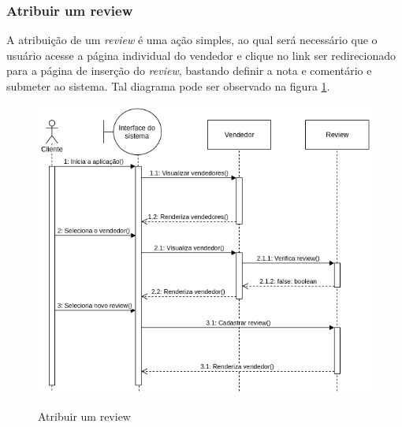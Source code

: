 \subsubsection{Atribuir um review}
A atribuição de um \textit{review} é uma ação simples, ao qual será necessário que o usuário acesse a página individual do vendedor e clique no link ser redirecionado para a página de inserção do \textit{review}, bastando definir a nota e comentário e submeter ao sistema. Tal diagrama pode ser observado na figura \ref{fig:sequence2}.
\begin{figure}[htbp!]
  \centering
  \caption{Atribuir um review}
  \includegraphics[width=1\textwidth]{figs/sequence2.png}
    \label{fig:sequence2}
\end{figure}

